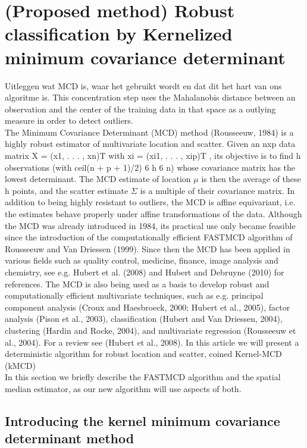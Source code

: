 \documentclass[preprint,12pt]{elsarticle}
\begin{document}
\newpage
\section{(Proposed method) Robust classification by Kernelized minimum covariance determinant}

Uitleggen wat MCD is, waar het gebruikt wordt en dat dit het hart van ons algoritme is.
This concentration step uses the Mahalanobis distance between an observation and the center of the training data in that space as a outlying measure in order to detect outliers.\\

The Minimum Covariance Determinant (MCD) method (Rousseeuw, 1984) is a highly robust
estimator of multivariate location and scatter. Given an nxp data matrix X = (x1, . . . , xn)T with xi = (xi1, . . . , xip)T , its objective is to find h observations (with ceil(n + p + 1)/2) 6 h 6 n) whose covariance matrix has the lowest determinant. The MCD estimate of location $\mu$ is then the average of these h points, and the scatter estimate $\Sigma$ is a multiple of their covariance matrix. In addition to being highly resistant to outliers, the MCD is affine equivariant, i.e. the estimates behave properly under affine transformations of the data. Although the MCD was already introduced in 1984, its practical use only became feasible
since the introduction of the computationally efficient FASTMCD algorithm of Rousseeuw and
Van Driessen (1999). Since then the MCD has been applied in various fields such as quality
control, medicine, finance, image analysis and chemistry, see e.g. Hubert et al. (2008) and Hubert
and Debruyne (2010) for references. The MCD is also being used as a basis to develop
robust and computationally efficient multivariate techniques, such as e.g. principal component
analysis (Croux and Haesbroeck, 2000; Hubert et al., 2005), factor analysis (Pison et al., 2003),
classification (Hubert and Van Driessen, 2004), clustering (Hardin and Rocke, 2004), and multivariate regression (Rousseeuw et al., 2004). For a review see (Hubert et al., 2008).
In this article we will present a deterministic algorithm for robust location and scatter, coined Kernel-MCD (kMCD) \\

In this section we briefly describe the FASTMCD algorithm and the spatial median estimator, as our new algorithm will use aspects of both.

\subsection{Introducing the kernel minimum covariance determinant method}
\end{document}
